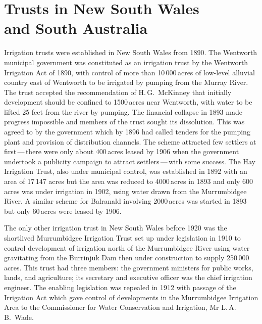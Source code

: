 \section*{Trusts in New South Wales\\ and South Australia}
 

Irrigation trusts were established in New South Wales from 1890.  The
Wentworth municipal government was constituted as an irrigation trust
by the Wentworth Irrigation Act  of 1890, with control of more than 10\,000\,acres of
low-level alluvial country east of Wentworth to be irrigated by
pumping from the Murray River.   The trust
accepted the recommendation of H.\,G.~McKinney that initially
development should be confined to 1500\,acres near Wentworth, with
water to be lifted 25 feet from the river by pumping.  The
financial collapse in 1893 made progress impossible and
members of the trust sought its dissolution.  This was agreed to by
the government which by 1896 had called tenders for the pumping plant
and provision of distribution channels. The
scheme attracted few settlers at first\,---\,there were only about
400\,acres leased by 1906 when the government undertook a publicity
campaign to attract settlers\,---\,with some success.  The Hay Irrigation Trust,  also under
municipal control, was established in 1892 with an area of 17\,147
acres but the area was reduced to 4000\,acres in 1893 and only
600\,acres was under irrigation in 1902, using water drawn from the
Murrumbid\-gee River.   A similar scheme for
Balranald  involving 2000\,acres was started in
1893 but only 60\,acres were leased by 1906.

The only other irrigation trust in New South Wales before 1920 was the
shortlived Murrumbidgee Irrigation Trust
 set up under legislation in 1910
to control development of irrigation north of the Murrumbidgee River
 using water gravitating from the Burrinjuk
Dam  then under
construction to supply 250\,000\,acres.  This trust had three members:
the government ministers for public works, lands, and agriculture; its
secretary and executive officer was the chief irrigation engineer.
The enabling legislation was repealed in 1912 with passage of the
Irrigation Act  which gave
control of developments in the Murrumbidgee Irrigation Area to the
Commissioner for Water Conservation and Irrigation, Mr
L.\,A.\,B.~Wade. 

